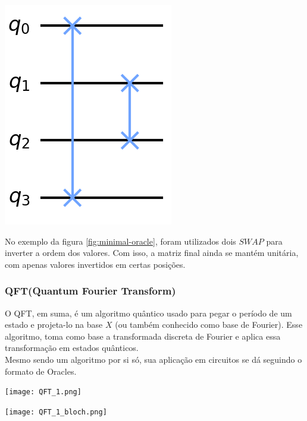 \documentclass{article}
\begin{document}
\begin{center}
	\includegraphics[scale=0.3]{minimal-oracle.png}
	\label{fig:minimal-oracle}
\end{center}

No exemplo da figura \ref{fig:minimal-oracle}, foram utilizados dois $SWAP$ para inverter a ordem dos valores. Com isso, a matriz final ainda se mantém unitária, com apenas valores invertidos em certas posições.

\subsubsection{QFT(Quantum Fourier Transform)}
O QFT, em suma, é um algoritmo quântico usado para pegar o período de um estado e projeta-lo na base $X$ (ou também conhecido como base de Fourier). Esse algoritmo, toma como base a transformada discreta de Fourier e aplica essa transformação em estados quânticos.\\
Mesmo sendo um algoritmo por si só, sua aplicação em circuitos se dá seguindo o formato de Oracles.

\begin{center}
	\texttt{[image: QFT\_1.png]}
	\label{fig:QFT}
\end{center}

\begin{center}
	\texttt{[image: QFT\_1\_bloch.png]}
	\label{fig:QFT-bloch}
\end{center}
\end{document}
